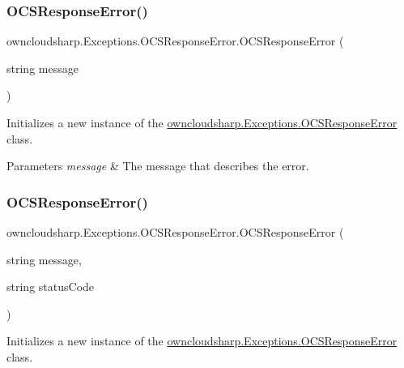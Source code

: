 \subsubsection{\texorpdfstring{O\+C\+S\+Response\+Error()}{OCSResponseError()}\hspace{0.1cm}{\footnotesize\ttfamily [2/3]}}
{\footnotesize\ttfamily owncloudsharp.\+Exceptions.\+O\+C\+S\+Response\+Error.\+O\+C\+S\+Response\+Error (\begin{DoxyParamCaption}\item[{string}]{message }\end{DoxyParamCaption})}



Initializes a new instance of the \hyperlink{classowncloudsharp_1_1_exceptions_1_1_o_c_s_response_error}{owncloudsharp.\+Exceptions.\+O\+C\+S\+Response\+Error} class. 


\begin{DoxyParams}{Parameters}
{\em message} & The message that describes the error.\\
\hline
\end{DoxyParams}
\mbox{\label{classowncloudsharp_1_1_exceptions_1_1_o_c_s_response_error_a140bbc4910589e73d076ba7a977b9e88}} 
\subsubsection{\texorpdfstring{O\+C\+S\+Response\+Error()}{OCSResponseError()}\hspace{0.1cm}{\footnotesize\ttfamily [3/3]}}
{\footnotesize\ttfamily owncloudsharp.\+Exceptions.\+O\+C\+S\+Response\+Error.\+O\+C\+S\+Response\+Error (\begin{DoxyParamCaption}\item[{string}]{message,  }\item[{string}]{status\+Code }\end{DoxyParamCaption})}



Initializes a new instance of the \hyperlink{classowncloudsharp_1_1_exceptions_1_1_o_c_s_response_error}{owncloudsharp.\+Exceptions.\+O\+C\+S\+Response\+Error} class. 



